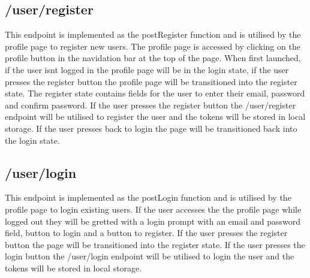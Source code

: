 \documentclass[12pt,a4paper]{article}
\begin{document}
		\newpage

		\subsection{/user/register}
			This endpoint is implemented as the postRegister function and is utilised by the profile 
			page to register new users. The profile page is accessed by clicking on the profile button 
			in the navidation bar at the top of the page. When first launched, if the user isnt logged 
			in the profile page will be in the login state, if the user presses the register button the 
			profile page will be transitioned into the register state. The register state contains 
			fields for the user to enter their email, password and confirm password. If the user 
			presses the register button the /user/register endpoint will be utilised to register the 
			user and the tokens will be stored in local storage. If the user presses back to login the 
			page will be transitioned back into the login state.\\

			\begin{center}
			\end{center}


		\newpage

		\subsection{/user/login}
			This endpoint is implemented as the postLogin function and is utilised by the profile page 
			to login existing users. If the user accesses the the profile page while logged out they 
			will be gretted with a login prompt with an email and password field, button to login and 
			a button to register. If the user presses the register button the page will be transitioned 
			into the register state. If the user presses the login button the /user/login endpoint will 
			be utilised to login the user and the tokens will be stored in local storage.\\
\end{document}
